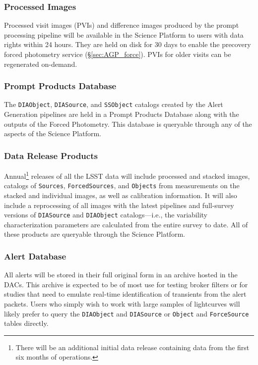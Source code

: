 \subsubsection{Processed Images} \label{sec:products}

Processed visit images (PVIs) and difference images produced by the prompt processing pipeline will be available in the Science Platform to users with data rights within 24 hours.
They are held on disk for 30 days to enable the precovery forced photometry service (\S \ref{sec:AGP_force}).
PVIs for older visits can be regenerated on-demand.

\subsubsection{Prompt Products Database} \label{sec:ppdb}

The \texttt{DIAObject}, \texttt{DIASource}, and \texttt{SSObject} catalogs created by the Alert Generation pipelines are held in a Prompt Products Database along with the outputs of the Forced Photometry.
This database is queryable through any of the aspects of the Science Platform.


\subsubsection{Data Release Products} \label{sec:drp}

Annual\footnote{There will be an additional initial data release containing data from the first six months of operations.}  releases of all the LSST data will include processed and stacked images, catalogs of {\tt Sources}, {\tt ForcedSources}, and {\tt Objects} from measurements on the stacked and individual images, as well as calibration information.
It will also include a  reprocessing of all images with the latest pipelines and full-survey versions of {\tt DIASource} and {\tt DIAObject} catalogs---i.e., the variability characterization parameters are calculated from the entire survey to date.
All of these products are queryable through the Science Platform.

\subsubsection{Alert Database} \label{sec:alertdb}

All alerts will be stored in their full original form in an archive hosted in the DACs.
This archive is expected to be of most use for testing broker filters or for studies that need to emulate real-time identification of transients from the alert packets.
Users who simply wish to work with large samples of lightcurves will likely prefer to query the \texttt{DIAObject} and \texttt{DIASource} or \texttt{Object} and \texttt{ForceSource} tables directly.
